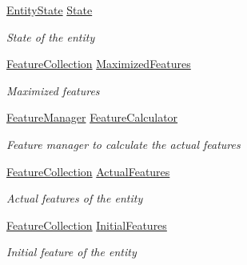 \begin{DoxyCompactItemize}
\hyperlink{class_hel_project_1_1_game_world_1_1_entities_1_1_h_entity_af0044d8a58b65254f673f8c0ecfecdea}{Entity\+State} \hyperlink{class_hel_project_1_1_game_world_1_1_entities_1_1_h_entity_a2e904ad6fe707cadd501a423e4768a0d}{State}
\begin{DoxyCompactList}\small\item\em State of the entity \end{DoxyCompactList}\item 
\hyperlink{class_hel_project_1_1_features_1_1_feature_collection}{Feature\+Collection} \hyperlink{class_hel_project_1_1_game_world_1_1_entities_1_1_h_entity_afb7fd74a8073bf8311bceba415e6022c}{Maximized\+Features}
\begin{DoxyCompactList}\small\item\em Maximized features \end{DoxyCompactList}\item 
\hyperlink{class_hel_project_1_1_features_1_1_feature_manager}{Feature\+Manager} \hyperlink{class_hel_project_1_1_game_world_1_1_entities_1_1_h_entity_a80aaee359bc963011a0f34c1f27aa47c}{Feature\+Calculator}
\begin{DoxyCompactList}\small\item\em Feature manager to calculate the actual features \end{DoxyCompactList}\item 
\hyperlink{class_hel_project_1_1_features_1_1_feature_collection}{Feature\+Collection} \hyperlink{class_hel_project_1_1_game_world_1_1_entities_1_1_h_entity_ad2f5977677a00f45a3402f11391e8282}{Actual\+Features}
\begin{DoxyCompactList}\small\item\em Actual features of the entity \end{DoxyCompactList}\item 
\hyperlink{class_hel_project_1_1_features_1_1_feature_collection}{Feature\+Collection} \hyperlink{class_hel_project_1_1_game_world_1_1_entities_1_1_h_entity_a155d3d12d931e900e26d770c120ec361}{Initial\+Features}
\begin{DoxyCompactList}\small\item\em Initial feature of the entity \end{DoxyCompactList}\end{DoxyCompactItemize}
